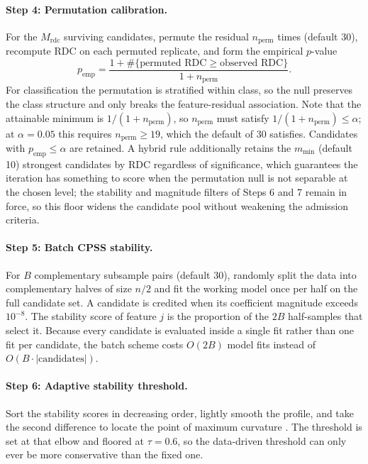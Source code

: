 \documentclass[11pt]{article}
\begin{document}
\paragraph{Step 4: Permutation calibration.} For the $M_{\mathrm{rdc}}$ surviving candidates, permute
the residual $n_{\mathrm{perm}}$ times (default 30), recompute RDC on each permuted replicate, and
form the empirical $p$-value
\begin{equation}
p_{\mathrm{emp}} = \frac{1 + \#\{\text{permuted RDC} \ge \text{observed RDC}\}}{1 + n_{\mathrm{perm}}}.
\end{equation}
For classification the permutation is stratified within class, so the null preserves the class
structure and only breaks the feature-residual association. Note that the attainable minimum is
$1/(1 + n_{\mathrm{perm}})$, so $n_{\mathrm{perm}}$ must satisfy
$1/(1 + n_{\mathrm{perm}}) \le \alpha$; at $\alpha = 0.05$ this requires
$n_{\mathrm{perm}} \ge 19$, which the default of 30 satisfies. Candidates with
$p_{\mathrm{emp}} \le \alpha$ are retained. A hybrid rule additionally retains the
$m_{\min}$ (default 10) strongest candidates by RDC regardless of significance, which guarantees the
iteration has something to score when the permutation null is not separable at the chosen level; the
stability and magnitude filters of Steps 6 and 7 remain in force, so this floor widens the candidate
pool without weakening the admission criteria.

\paragraph{Step 5: Batch CPSS stability.} For $B$ complementary subsample pairs (default 30),
randomly split the data into complementary halves of size $n/2$ and fit the working model once per
half on the full candidate set. A candidate is credited when its coefficient magnitude exceeds
$10^{-8}$. The stability score of feature $j$ is the proportion of the $2B$ half-samples that select
it. Because every candidate is evaluated inside a single fit rather than one fit per candidate, the
batch scheme costs $O(2B)$ model fits instead of $O(B \cdot |\text{candidates}|)$.

\paragraph{Step 6: Adaptive stability threshold.} Sort the stability scores in decreasing order,
lightly smooth the profile, and take the second difference to locate the point of maximum curvature
\citep{salvador2004}. The threshold is set at that elbow and floored at $\tau = 0.6$, so the
data-driven threshold can only ever be more conservative than the fixed one.
\end{document}
